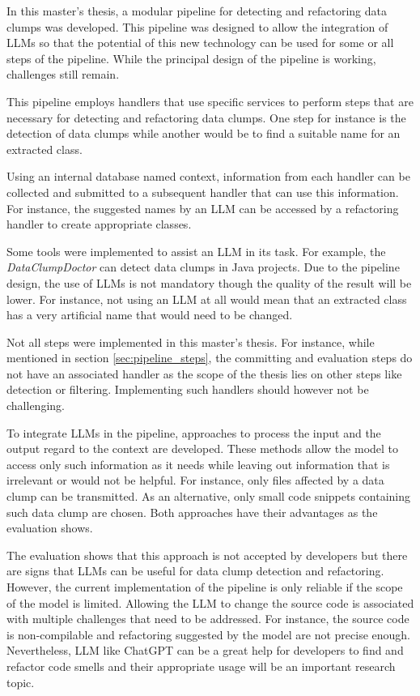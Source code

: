 In this master's thesis, a modular pipeline for detecting and refactoring data clumps was developed. This pipeline was designed to allow the integration of \acp{LLM} so that the potential of this new technology can be used for some or all steps of the pipeline. While the principal design of the pipeline is working, challenges still remain.   


This pipeline employs handlers that use specific services to perform steps that are necessary for detecting and refactoring data clumps. One step for instance is the detection of data clumps while another would be to find a suitable name for an extracted class. 

Using an internal database named context, information from each handler can be collected and submitted to a subsequent handler that can use this information. For instance, the suggested names by an \ac{LLM} can be accessed by a refactoring handler to create appropriate classes. 

Some tools were implemented to assist an \ac{LLM} in its task. For example, the \textit{DataClumpDoctor} can detect data clumps in Java projects. Due to the pipeline design, the use of \acp{LLM} is not mandatory though the quality of the result will be lower. For instance, not using an \ac{LLM} at all would mean that an extracted class  has a very artificial name that would need to be changed. 

Not all steps were implemented in this master's thesis. For instance, while mentioned in section \ref{sec:pipeline_steps}, the committing and evaluation steps do not have an associated handler as the scope of the thesis lies on other steps like detection or filtering. Implementing such handlers should however not be challenging. 

To integrate \acp{LLM} in the pipeline, approaches to process the input and the output regard to the context are developed. These methods allow the model to access only such information as it needs while leaving out information that is irrelevant or would not be helpful. For instance, only files affected by a data clump can be transmitted. As an alternative, only small code snippets containing such data  clump are chosen. Both approaches have their advantages as the evaluation shows. 

The evaluation shows that this approach is not accepted by developers but there are signs that \acp{LLM} can be useful for data clump detection and refactoring. However, the current implementation of the pipeline is only reliable if the scope of the model is limited. Allowing the \ac{LLM} to change the source code is associated with  multiple challenges that need to be addressed.  For instance, the source code is non-compilable and refactoring suggested by the model are not precise enough. Nevertheless, \ac{LLM} like ChatGPT can be a great help for developers to find and refactor code smells and their appropriate usage will be an important research topic. 

